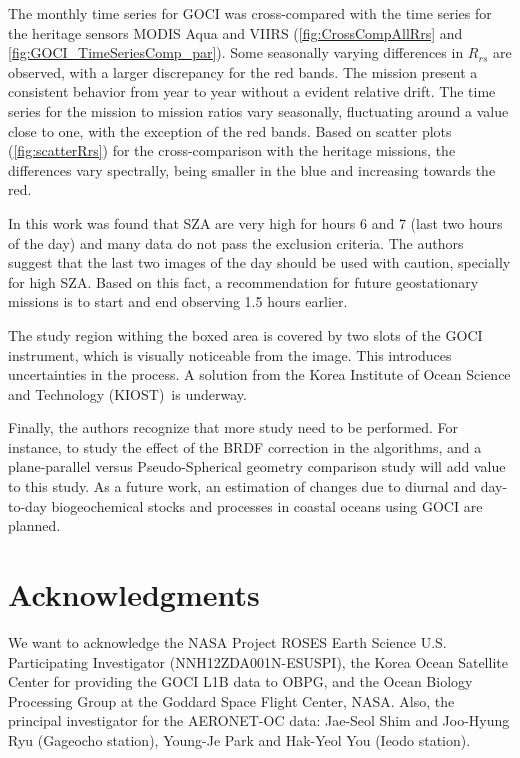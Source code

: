\documentclass[onecolumn,3p,letterpaper,11pt]{elsarticle}
\begin{document}
The monthly time series for GOCI was cross-compared with the time series for the heritage sensors MODIS Aqua and VIIRS (\autoref{fig:CrossCompAllRrs} and \autoref{fig:GOCI_TimeSeriesComp_par}).
Some seasonally varying differences in $R_{rs}$ are observed, with a larger discrepancy for the red bands. 
The mission present a consistent behavior from year to year without a evident relative drift.
The time series for the mission to mission ratios vary seasonally, fluctuating around a value close to one, with the exception of the red bands.
Based on scatter plots (\autoref{fig:scatterRrs}) for the cross-comparison with the heritage missions, the differences vary spectrally, being smaller in the blue and increasing towards the red. 

In this work was found that SZA are very high for hours 6 and 7 (last two hours of the day) and many data do not pass the exclusion criteria. The authors suggest that the last two images of the day should be used with caution, specially for high SZA. Based on this fact, a recommendation for future geostationary missions is to start and end observing 1.5 hours earlier.

The study region withing the boxed area is covered by two slots of the GOCI instrument, which is visually noticeable from the image. This introduces uncertainties in the process. A solution from the Korea Institute of Ocean Science and Technology (KIOST)~is underway.


Finally, the authors recognize that more study need to be performed. For instance, to study the effect of the BRDF correction in the algorithms, and a plane-parallel versus Pseudo-Spherical geometry comparison study will add value to this study. As a future work, an estimation of changes due to diurnal and day-to-day biogeochemical stocks and processes in coastal oceans using GOCI are planned.


\section*{Acknowledgments}
\vspace{-.2cm}
We want to acknowledge the NASA Project ROSES Earth Science U.S. Participating Investigator (NNH12ZDA001N-ESUSPI), the Korea Ocean Satellite Center for providing the GOCI L1B data to OBPG, and the Ocean Biology Processing Group at the Goddard Space Flight Center, NASA. Also, the principal investigator for the AERONET-OC data: Jae-Seol Shim and Joo-Hyung Ryu (Gageocho station), Young-Je Park and Hak-Yeol You (Ieodo station).
\end{document}
